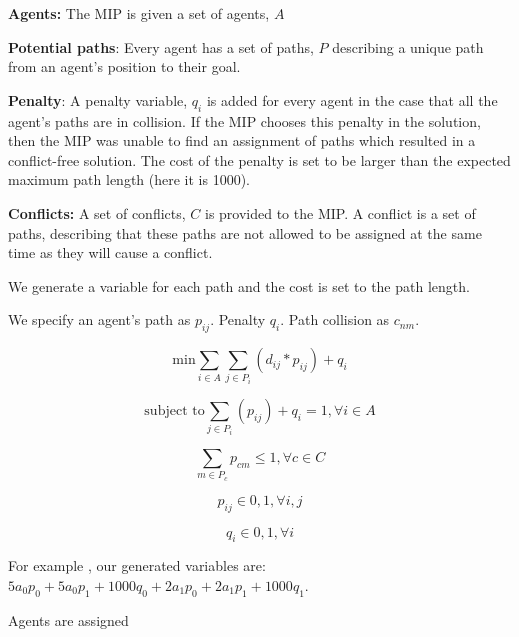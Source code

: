 \documentclass[a4paper,11pt]{article}
\begin{document}
\begin{compactitem}
	\item \textbf{Agents:} The MIP is given a set of agents, $A$
	\item \textbf{Potential paths}: Every agent has a set of paths, $P$ describing a unique path from an agent's position to their goal.
	\item \textbf{Penalty}: A penalty variable, $q_i$ is added for every agent in the case that all the agent's paths are in collision. If the MIP chooses this penalty in the solution, then the MIP was unable to find an assignment of paths which resulted in a conflict-free solution. The cost of the penalty is set to be larger than the expected maximum path length (here it is 1000).
	\item \textbf{Conflicts:} A set of conflicts, $C$ is provided to the MIP. A conflict is a set of paths, describing that these paths are not allowed to be assigned at the same time as they will cause a conflict. 
\end{compactitem}

We generate a variable for each path and the cost is set to the path length.

We specify an agent's path as $p_{ij}$. Penalty $q_i$. Path collision as $c_{nm}$.



\begin{equation} \label{mas:min}
\text{min} \sum_{i \in A} \sum_{j \in P_i} (d_{ij} * p_{ij}) + q_i
\end{equation}

\begin{equation} \label{mas:pick} %
\text{subject to} \sum_{j \in P_i} (p_{ij}) + q_i = 1, \forall i \in A
\end{equation}

\begin{equation} \label{mas:conflict} %
\sum_{m \in P_c} p_{cm} \le 1, \forall c \in C
\end{equation}

\begin{equation} \label{mas:path-one-or-zero} %
p_{ij} \in {0, 1}, \forall i, j
\end{equation}

\begin{equation} \label{mas:penalty} %
q_{i} \in {0, 1}, \forall i
\end{equation}

For example \cite{put example!}, our generated variables are: $5a_0p_0 + 5a_0p_1 + 1000q_0 + 2a_1p_0 + 2a_1p_1 + 1000q_1$.

Agents are assigned





	
\end{document}
